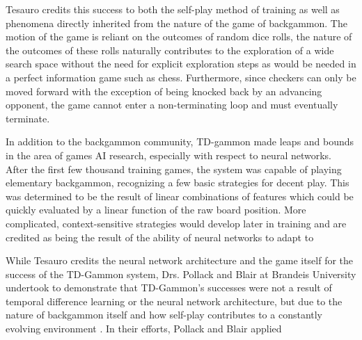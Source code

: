 Tesauro credits this success to both the self-play method of training
as well as phenomena directly inherited from the nature of the game of
backgammon.
%
The motion of the game is reliant on the outcomes of random dice rolls,
the nature of the outcomes of these rolls naturally contributes to the
exploration of a wide search space without the need for explicit exploration
steps as would be needed in a perfect information game such as chess.
%
Furthermore,
since checkers can only be moved forward
with the exception of being knocked back by an advancing opponent,
the game cannot enter a non-terminating loop and must eventually
terminate.

In addition to the backgammon community,
TD-gammon made leaps and bounds in the area of games AI research,
especially with respect to neural networks.
%
After the first few thousand training games,
the system was capable of playing elementary backgammon,
recognizing a few basic strategies for decent play.
%
This was determined to be the result of linear combinations of features which
could be quickly evaluated by a linear function of the raw board position.
%
More complicated, context-sensitive strategies would develop later in training
and are credited as being the result of the ability of neural networks to adapt
to


While Tesauro credits the neural network architecture and the game itself for
the success of the TD-Gammon system,
Drs. Pollack and Blair at Brandeis University undertook to demonstrate that
TD-Gammon's successes were not a result of temporal difference learning or the
neural network architecture,
but due to the nature of backgammon itself and how self-play contributes to a
constantly evolving environment
\cite{why-td-gammon}.
%
In their efforts,
Pollack and Blair applied

